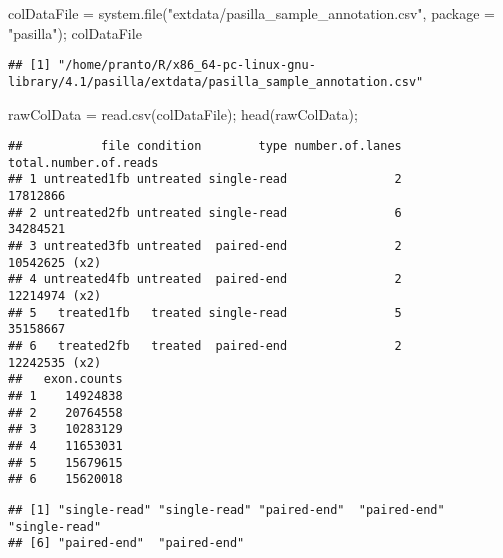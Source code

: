 \documentclass[
]{article}
\newenvironment{Shaded}{\begin{snugshade}}{\end{snugshade}}
\newcommand{\AttributeTok}[1]{\textcolor[rgb]{0.77,0.63,0.00}{#1}}
\newcommand{\FunctionTok}[1]{\textcolor[rgb]{0.00,0.00,0.00}{#1}}
\newcommand{\NormalTok}[1]{#1}
\newcommand{\OtherTok}[1]{\textcolor[rgb]{0.56,0.35,0.01}{#1}}
\newcommand{\SpecialCharTok}[1]{\textcolor[rgb]{0.00,0.00,0.00}{#1}}
\newcommand{\StringTok}[1]{\textcolor[rgb]{0.31,0.60,0.02}{#1}}
\begin{document}
\begin{Shaded}
\begin{Highlighting}[]
\NormalTok{colDataFile }\OtherTok{=} \FunctionTok{system.file}\NormalTok{(}\StringTok{"extdata/pasilla\_sample\_annotation.csv"}\NormalTok{, }\AttributeTok{package =} \StringTok{"pasilla"}\NormalTok{);}
\NormalTok{colDataFile}
\end{Highlighting}
\end{Shaded}

\begin{verbatim}
## [1] "/home/pranto/R/x86_64-pc-linux-gnu-library/4.1/pasilla/extdata/pasilla_sample_annotation.csv"
\end{verbatim}

\begin{Shaded}
\begin{Highlighting}[]
\NormalTok{rawColData }\OtherTok{=} \FunctionTok{read.csv}\NormalTok{(colDataFile);}
\FunctionTok{head}\NormalTok{(rawColData);}
\end{Highlighting}
\end{Shaded}

\begin{verbatim}
##           file condition        type number.of.lanes total.number.of.reads
## 1 untreated1fb untreated single-read               2              17812866
## 2 untreated2fb untreated single-read               6              34284521
## 3 untreated3fb untreated  paired-end               2         10542625 (x2)
## 4 untreated4fb untreated  paired-end               2         12214974 (x2)
## 5   treated1fb   treated single-read               5              35158667
## 6   treated2fb   treated  paired-end               2         12242535 (x2)
##   exon.counts
## 1    14924838
## 2    20764558
## 3    10283129
## 4    11653031
## 5    15679615
## 6    15620018
\end{verbatim}

\begin{Shaded}
\end{Shaded}

\begin{verbatim}
## [1] "single-read" "single-read" "paired-end"  "paired-end"  "single-read"
## [6] "paired-end"  "paired-end"
\end{verbatim}
\end{document}
